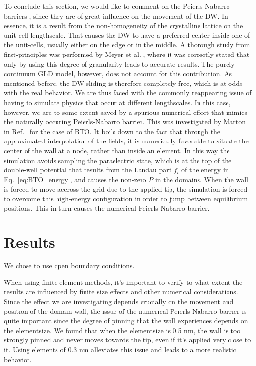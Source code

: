 To conclude this section, we would like to comment on the Peierls-Nabarro barriers \cite{Peierls1940,Nabarro1947}, since they are of great influence on the movement of the DW.
In essence, it is a result from the non-homogeneity of the crystalline lattice on the unit-cell lengthscale.
That causes the DW to have a preferred center inside one of the unit-cells, usually either on the edge or in the middle.
A thorough study from first-principles was performed by Meyer et al. \cite{Meyer2002}, where it was correctly stated that only by using this degree of granularity leads to accurate results.
The purely continuum GLD model, however, does not account for this contribution.
As mentioned before, the DW sliding is therefore completely free, which is at odds with the real behavior.
We are thus faced with the commonly reappearing issue of having to simulate physics that occur at different lengthscales.
In this case, however, we are to some extent saved by a spurious numerical effect that mimics the naturally occuring Peierls-Nabarro barrier.
This was investigated by Marton in Ref.~\cite{Marton2018} for the case of BTO.
It boils down to the fact that through the approximated interpolation of the fields, it is numerically favorable to situate the center of the wall at a node, rather than inside an element.
In this way the simulation avoids sampling the paraelectric state, which is at the top of the double-well potential that results from the Landau part $f_l$ of the energy in Eq.~\ref{eq:BTO_energy}, and causes the non-zero $P$ in the domains.
When the wall is forced to move accross the grid due to the applied tip, the simulation is forced to overcome this high-energy configuration in order to jump between equilibrium positions.
This in turn causes the numerical Peierls-Nabarro barrier.










\section{Results}

We chose to use open boundary conditions.

When using finite element methods, it's important to verify to what extent the results are influenced by finite size effects and other numerical considerations.
Since the effect we are investigating depends crucially on the movement and position of the domain wall, the issue of the numerical Peierls-Nabarro barrier \cite{Marton2018} is quite important since the degree of pinning that the wall experiences depends on the elementsize.
We found that when the elementsize is 0.5 nm, the wall is too strongly pinned and never moves towards the tip, even if it's applied very close to it.
Using elements of 0.3 nm alleviates this issue and leads to a more realistic behavior.


